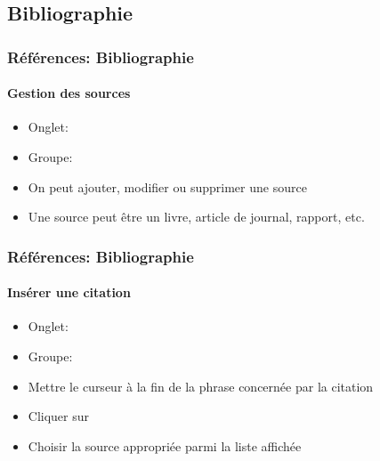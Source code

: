 \documentclass[xcolor=table]{beamer}
\begin{document}
\subsection{Bibliographie}

\begin{frame}[t]
\frametitle{Références: Bibliographie}
\framesubtitle{Gestion des sources}

\begin{minipage}{0.48\textwidth}
	\begin{itemize}
		\item Onglet: 
		\item Groupe: 
		\item On peut ajouter, modifier ou supprimer une source  
		\item Une source peut être un livre, article de journal, rapport, etc.
	\end{itemize}
\end{minipage}
\begin{minipage}{0.50\textwidth}
	
	
	
\end{minipage}

\end{frame}

\begin{frame}[t]
\frametitle{Références: Bibliographie}
\framesubtitle{Insérer une citation}

\begin{minipage}{0.68\textwidth}
	\begin{itemize}
		\item Onglet: 
		\item Groupe: 
		\item Mettre le curseur à la fin de la phrase concernée par la citation
		\item Cliquer sur 
		\item Choisir la source appropriée parmi la liste affichée
	\end{itemize}
\end{minipage}
\begin{minipage}{0.30\textwidth}
	
%	
	
\end{minipage}

\end{frame}
\end{document}
